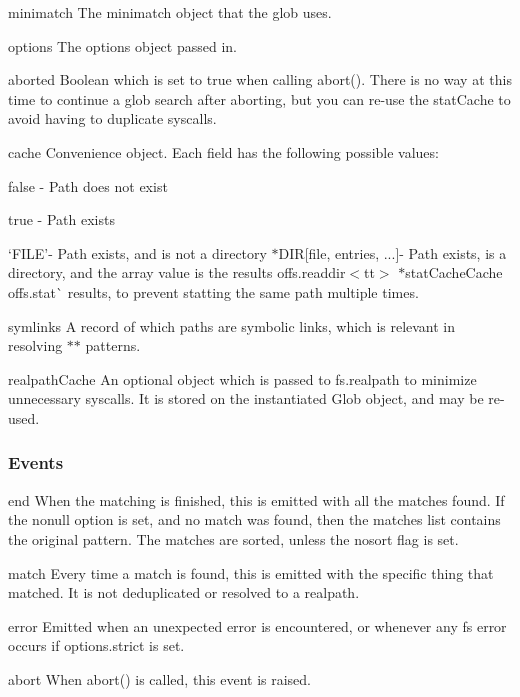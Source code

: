 \begin{DoxyItemize}
\item {\ttfamily minimatch} The minimatch object that the glob uses.
\item {\ttfamily options} The options object passed in.
\item {\ttfamily aborted} Boolean which is set to true when calling {\ttfamily abort()}. There is no way at this time to continue a glob search after aborting, but you can re-\/use the stat\+Cache to avoid having to duplicate syscalls.
\item {\ttfamily cache} Convenience object. Each field has the following possible values\+:
\begin{DoxyItemize}
\item {\ttfamily false} -\/ Path does not exist
\item {\ttfamily true} -\/ Path exists
\item `\textquotesingle{}F\+I\+LE'{\ttfamily -\/ Path exists, and is not a directory $\ast$}\textquotesingle{}D\+IR\mbox{[}file, entries, ...\mbox{]}{\ttfamily -\/ Path exists, is a directory, and the array value is the results of}fs.\+readdir$<$tt$>$ $\ast$stat\+Cache{\ttfamily Cache of}fs.\+stat\`{} results, to prevent statting the same path multiple times.
\end{DoxyItemize}
\item {\ttfamily symlinks} A record of which paths are symbolic links, which is relevant in resolving {\ttfamily $\ast$$\ast$} patterns.
\item {\ttfamily realpath\+Cache} An optional object which is passed to {\ttfamily fs.\+realpath} to minimize unnecessary syscalls. It is stored on the instantiated Glob object, and may be re-\/used.
\end{DoxyItemize}

\subsubsection*{Events}


\begin{DoxyItemize}
\item {\ttfamily end} When the matching is finished, this is emitted with all the matches found. If the {\ttfamily nonull} option is set, and no match was found, then the {\ttfamily matches} list contains the original pattern. The matches are sorted, unless the {\ttfamily nosort} flag is set.
\item {\ttfamily match} Every time a match is found, this is emitted with the specific thing that matched. It is not deduplicated or resolved to a realpath.
\item {\ttfamily error} Emitted when an unexpected error is encountered, or whenever any fs error occurs if {\ttfamily options.\+strict} is set.
\item {\ttfamily abort} When {\ttfamily abort()} is called, this event is raised.
\end{DoxyItemize}

